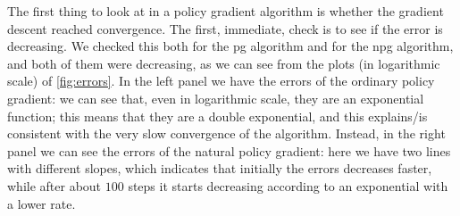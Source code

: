 The first thing to look at in a policy gradient algorithm is whether the gradient descent reached convergence. The first, immediate, check is to see if the error is decreasing. We checked this both for the \acrshort{pg} algorithm and for the \acrshort{npg} algorithm, and both of them were decreasing, as we can see from the plots (in logarithmic scale) of \autoref{fig:errors}. In the left panel we have the errors of the ordinary policy gradient: we can see that, even in logarithmic scale, they are an exponential function; this means that they are a double exponential, and this explains/is consistent with the very slow convergence of the algorithm. Instead, in the right panel we can see the errors of the natural policy gradient: here we have two lines with different slopes, which indicates that initially the errors decreases faster, while after about $100$ steps it starts decreasing according to an exponential with a lower rate.

